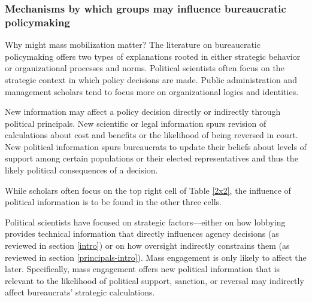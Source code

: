 \subsubsection{Mechanisms by which groups may influence bureaucratic policymaking}


Why might mass mobilization matter? The literature on bureaucratic policymaking offers two types of explanations rooted in either strategic behavior or organizational processes and norms. Political scientists often focus on the strategic context in which policy decisions are made. Public administration and management scholars tend to focus more on organizational logics and identities. 

New information may affect a policy decision directly or indirectly through political principals. New scientific or legal information spurs revision of calculations about cost and benefits or the likelihood of being reversed in court. New political information spurs bureaucrats to update their beliefs about levels of support among certain populations or their elected representatives and thus the likely political consequences of a decision. %

While scholars often focus on the top right cell of Table \ref{2x2}, the influence of political information is to be found in the other three cells. 

Political scientists have focused on strategic factors---either on how lobbying provides technical information that directly influences agency decisions (as reviewed in section \ref{intro}) or on how oversight indirectly constrains them (as reviewed in section \ref{principals-intro}).  Mass engagement is only likely to affect the later.
Specifically, mass engagement offers new political information that is relevant to the likelihood of political support, sanction, or reversal may indirectly affect bureaucrats' strategic calculations.

